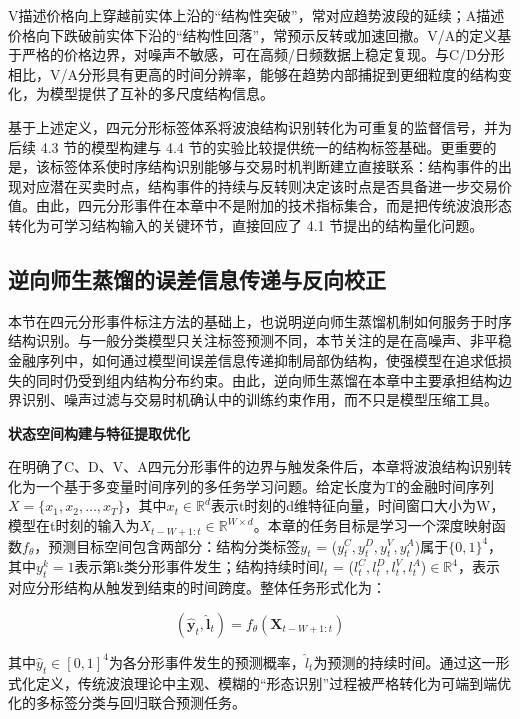 V描述价格向上穿越前实体上沿的``结构性突破''，常对应趋势波段的延续；A描述价格向下跌破前实体下沿的``结构性回落''，常预示反转或加速回撤。V/A的定义基于严格的价格边界，对噪声不敏感，可在高频/日频数据上稳定复现。与C/D分形相比，V/A分形具有更高的时间分辨率，能够在趋势内部捕捉到更细粒度的结构变化，为模型提供了互补的多尺度结构信息。

基于上述定义，四元分形标签体系将波浪结构识别转化为可重复的监督信号，并为后续 4.3 节的模型构建与 4.4 节的实验比较提供统一的结构标签基础。更重要的是，该标签体系使时序结构识别能够与交易时机判断建立直接联系：结构事件的出现对应潜在买卖时点，结构事件的持续与反转则决定该时点是否具备进一步交易价值。由此，四元分形事件在本章中不是附加的技术指标集合，而是把传统波浪形态转化为可学习结构输入的关键环节，直接回应了 4.1 节提出的结构量化问题。

\subsection{逆向师生蒸馏的误差信息传递与反向校正}

本节在四元分形事件标注方法的基础上，也说明逆向师生蒸馏机制如何服务于时序结构识别。与一般分类模型只关注标签预测不同，本节关注的是在高噪声、非平稳金融序列中，如何通过模型间误差信息传递抑制局部伪结构，使强模型在追求低损失的同时仍受到组内结构分布约束。由此，逆向师生蒸馏在本章中主要承担结构边界识别、噪声过滤与交易时机确认中的训练约束作用，而不只是模型压缩工具。

\noindent\textbf{状态空间构建与特征提取优化}\par

在明确了C、D、V、A四元分形事件的边界与触发条件后，本章将波浪结构识别转化为一个基于多变量时间序列的多任务学习问题。给定长度为T的金融时间序列$X = \{x_1, x_2, \dots, x_T\}$，其中$x_t \in \mathbb{R}^d$表示t时刻的d维特征向量，时间窗口大小为W，模型在t时刻的输入为$X_{t-W+1:t} \in \mathbb{R}^{W \times d}$。本章的任务目标是学习一个深度映射函数$f_\theta$，预测目标空间包含两部分：结构分类标签$y_t$ = ($y^C_t, y^D_t, y^V_t, y^A_t$)属于$\{0, 1\}^4$，其中$y^k_t = 1$表示第k类分形事件发生；结构持续时间$l_t$ = ($l^C_t, l^D_t, l^V_t, l^A_t$)$\in \mathbb{R}^4$，表示对应分形结构从触发到结束的时间跨度。整体任务形式化为：

\begin{equation}
    (\hat{\mathbf{y}}_t, \hat{\mathbf{l}}_t) = f_\theta(\mathbf{X}_{t-W+1:t})
\end{equation}

其中$\hat{y}_t \in [0, 1]^4$为各分形事件发生的预测概率，$\hat{l}_t$为预测的持续时间。通过这一形式化定义，传统波浪理论中主观、模糊的``形态识别''过程被严格转化为可端到端优化的多标签分类与回归联合预测任务。

